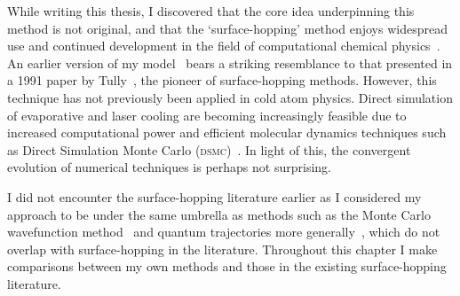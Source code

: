 While writing this thesis, I discovered that the core idea underpinning this method is not original, and that the `surface-hopping' method enjoys widespread use and continued development in the field of computational chemical physics~\cite{doi:10.1063/1.459170, A801824C, doi:10.1146/annurev-physchem-040215-112245, doi:10.1063/1.1675788, doi:10.1063/1.3575588, doi:10.1063/1.447708, doi:10.1063/1.3489004, doi:10.1063/1.2715585, C6SC01319H, doi:10.1063/1.479058, doi:10.1063/1.4829856}. An earlier version of my model~\cite{billington_monte_2015} bears a striking resemblance to that presented in a 1991 paper by Tully~\cite{doi:10.1063/1.459170}, the pioneer of surface-hopping methods. However, this technique has not previously been applied in cold atom physics. Direct simulation of evaporative and laser cooling are becoming increasingly feasible due to increased computational power and efficient molecular dynamics techniques such as Direct Simulation Monte Carlo (\textsc{dsmc})~\cite{DIETRICH1996328}. In light of this, the convergent evolution of numerical techniques is perhaps not surprising.

I did not encounter the surface-hopping literature earlier as I considered my approach to be under the same umbrella as methods such as the Monte Carlo wavefunction method~\cite{Molmer:93} and quantum trajectories more generally~\cite{1355-5111-8-1-015, 2003LNP...622..233H}, which do not overlap with surface-hopping in the literature. Throughout this chapter I make comparisons between my own methods and those in the existing surface-hopping literature.


